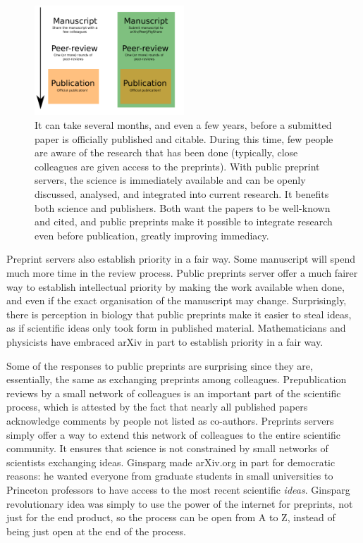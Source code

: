 \documentclass[letterpaper,twocolumn,superscriptaddress,showkeys]{revtex4}
\begin{document}
\begin{figure}[ht!] \centering\includegraphics[width=0.50\textwidth]{map.pdf}
\caption { It can take several months, and even a few years, before a submitted
paper is officially published and citable. During this time, few people are
aware of the research that has been done (typically, close colleagues are
given access to the preprints). With public preprint servers, the science is
immediately available and can be openly discussed, analysed, and integrated
into current research. It benefits both science and publishers. Both want the
papers to be well-known and cited, and public preprints make it possible to
integrate research even before publication, greatly improving immediacy.  }
\label{fig:map}
\end{figure}

Preprint servers also establish priority in a fair way. Some manuscript will
spend much more time in the review process. Public preprints server offer a
much fairer way to establish intellectual priority by making the work
available when done, and even if the exact organisation of the manuscript may
change. Surprisingly, there is perception in biology that public preprints
make it easier to steal ideas, as if scientific ideas only took form in
published material.
Mathematicians and physicists have embraced arXiv in part
to establish priority in a fair way\cite{cal12}.

Some of the responses to public preprints are surprising since they are,
essentially, the same as exchanging preprints among colleagues.
Prepublication reviews by a small network of colleagues is an important part
of the scientific process, which is attested by the fact that nearly all
published papers acknowledge comments by people not listed as co-authors.
Preprints servers simply offer a way to extend this network of colleagues to
the entire scientific community. It ensures that science is not constrained by
small networks of scientists exchanging ideas. Ginsparg made arXiv.org in part
for democratic reasons: he wanted everyone from graduate students in small
universities to Princeton professors to have access to the most recent
scientific \emph{ideas}.
Ginsparg revolutionary idea was simply to use the power of the internet for
preprints, not just for the end product, so the process can be open from A to
Z, instead of being just open at the end of the process.
\end{document}
